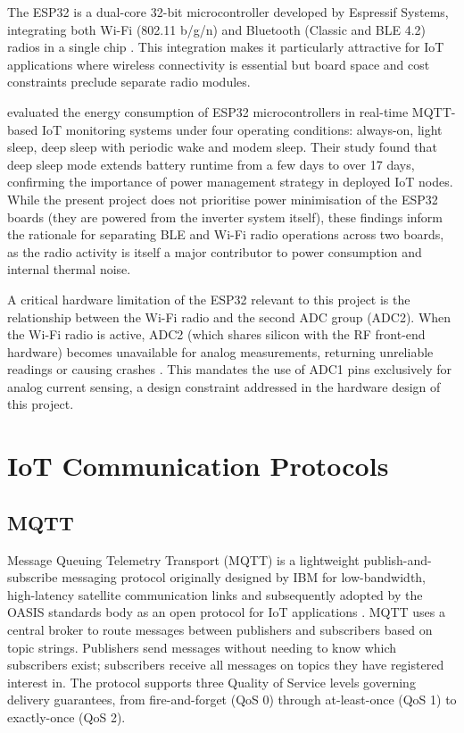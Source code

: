 \documentclass[12pt, a4paper]{report}
\begin{document}
The ESP32 is a dual-core 32-bit microcontroller developed by Espressif
Systems, integrating both Wi-Fi (802.11 b/g/n) and Bluetooth (Classic and
BLE 4.2) radios in a single chip \citep{espressif2024}. This integration
makes it particularly attractive for IoT applications where wireless
connectivity is essential but board space and cost constraints preclude
separate radio modules.

\citet{dzahir2023} evaluated the energy consumption of ESP32
microcontrollers in real-time MQTT-based IoT monitoring systems under
four operating conditions: always-on, light sleep, deep sleep with
periodic wake and modem sleep. Their study found that deep sleep mode
extends battery runtime from a few days to over 17 days, confirming the
importance of power management strategy in deployed IoT nodes. While
the present project does not prioritise power minimisation of the ESP32
boards (they are powered from the inverter system itself), these findings
inform the rationale for separating BLE and Wi-Fi radio operations across
two boards, as the radio activity is itself a major contributor to power
consumption and internal thermal noise.

A critical hardware limitation of the ESP32 relevant to this project is
the relationship between the Wi-Fi radio and the second ADC group (ADC2).
When the Wi-Fi radio is active, ADC2 (which shares silicon with the RF
front-end hardware) becomes unavailable for analog measurements, returning
unreliable readings or causing crashes \citep{espressif2024}. This
mandates the use of ADC1 pins exclusively for analog current sensing, a
design constraint addressed in the hardware design of this project.

\section{IoT Communication Protocols}

\subsection{MQTT}

Message Queuing Telemetry Transport (MQTT) is a lightweight
publish-and-subscribe messaging protocol originally designed by IBM for
low-bandwidth, high-latency satellite communication links and subsequently
adopted by the OASIS standards body as an open protocol for IoT
applications \citep{oasis2019}. MQTT uses a central broker to route
messages between publishers and subscribers based on topic strings.
Publishers send messages without needing to know which subscribers exist;
subscribers receive all messages on topics they have registered interest
in. The protocol supports three Quality of Service levels governing
delivery guarantees, from fire-and-forget (QoS 0) through at-least-once
(QoS 1) to exactly-once (QoS 2).
\end{document}
